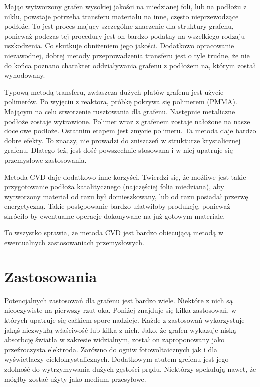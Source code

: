 	Mając wytworzony grafen wysokiej jakości na miedzianej foli, lub na podłożu z niklu, powstaje potrzeba transferu
	materiału na inne, często nieprzewodzące podłoże. To jest proces mający szczególne znaczenie dla struktury 
	grafenu, ponieważ podczas tej procedury jest on bardzo podatny na wszelkiego rodzaju uszkodzenia. Co skutkuje 
	obniżeniem jego jakości. Dodatkowo opracowanie niezawodnej, dobrej metody przeprowadzenia transferu jest o tyle
	trudne, że nie do końca poznano charakter oddziaływania grafenu z podłożem na, którym został wyhodowany.
	
	Typową metodą transferu, zwłaszcza dużych płatów grafenu jest użycie polimerów. Po wyjęciu z reaktora, próbkę 
	pokrywa się polimerem (PMMA). Mającym na celu stworzenie rusztowania dla grafenu. Następnie metaliczne podłoże 
	zostaje wytrawione. Polimer wraz z grafenem zostaje nałożone na nasze docelowe podłoże. Ostatnim etapem jest
	zmycie polimeru. Ta metoda daje bardzo dobre efekty. To znaczy, nie prowadzi do zniszczeń w strukturze krystalicznej
	grafenu. Dlatego też, jest dość powszechnie stosowana i w niej upatruje się przemysłowe zastosowania.
	


	Metoda CVD daje dodatkowo inne korzyści. Twierdzi się, że możliwe jest takie przygotowanie podłoża katalitycznego 
	(najczęściej folia miedziana), aby wytworzony materiał od razu był domieszkowany, lub od razu posiadał 
	przerwę energetyczną. Takie postępowanie bardzo ułatwiłoby produkcję, ponieważ skróciło by ewentualne 
	operacje dokonywane na już gotowym materiale. 

	To wszystko sprawia, że metoda CVD jest bardzo obiecującą metodą w ewentualnych zastosowaniach przemysłowych.

	\section{Zastosowania}
	
	Potencjalnych zastosowań dla grafenu jest bardzo wiele. Niektóre z nich są nieoczywiste na pierwszy rzut oka. 
	Poniżej znajduje się kilka zastosowań, w których upatruje się całkiem spore nadzieje.
	Każde z zastosowań wykorzystuje jakąś niezwykłą właściwość lub kilka z nich. 
	Jako, że grafen wykazuje niską absorbcję światła w zakresie widzialnym, został on zaproponowany jako przeźroczysta
	elektroda. Zarówno do ogniw fotowoltaicznych jak i dla wyświetlaczy ciekłokrystalicznych. Dodatkowym atutem grefenu
	jest jego zdolność do wytrzymywania dużych gęstości prądu. Niektórzy spekulują nawet, że mógłby zostać użyty
	jako medium przesyłowe.
	
